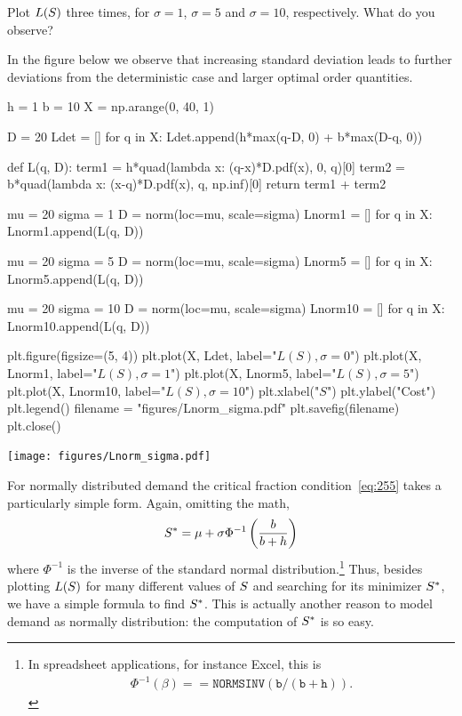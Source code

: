 \begin{exercise}[Continuation]
Plot $L(S)$ three times, for $\sigma=1$, $\sigma=5$ and $\sigma=10$, respectively. What do you observe?
\begin{solution}
In the figure below we observe that increasing standard deviation leads to further deviations from the deterministic case and larger optimal order quantities. 

\begin{pycode}[news]
h = 1
b = 10
X = np.arange(0, 40, 1)

D = 20
Ldet = []
for q in X:
    Ldet.append(h*max(q-D, 0) + b*max(D-q, 0))

def L(q, D):
    term1 = h*quad(lambda x: (q-x)*D.pdf(x), 0, q)[0]
    term2 = b*quad(lambda x: (x-q)*D.pdf(x), q, np.inf)[0]
    return term1 + term2


mu = 20
sigma = 1
D = norm(loc=mu, scale=sigma) 
Lnorm1 = []
for q in X:
    Lnorm1.append(L(q, D))

mu = 20
sigma = 5 
D = norm(loc=mu, scale=sigma) 
Lnorm5 = []
for q in X:
    Lnorm5.append(L(q, D))

mu = 20
sigma = 10
D = norm(loc=mu, scale=sigma) 
Lnorm10 = []
for q in X:
    Lnorm10.append(L(q, D))


plt.figure(figsize=(5, 4))
plt.plot(X, Ldet, label="$L(S), \sigma=0$")
plt.plot(X, Lnorm1, label="$L(S), \sigma=1$")
plt.plot(X, Lnorm5, label="$L(S), \sigma=5$")
plt.plot(X, Lnorm10, label="$L(S), \sigma=10$")
plt.xlabel("$S$")
plt.ylabel("Cost")
plt.legend()
filename = "figures/Lnorm_sigma.pdf"
plt.savefig(filename)
plt.close()
\end{pycode}

\begin{center}
\texttt{[image: figures/Lnorm\_sigma.pdf]}
\end{center}


\end{solution}
\end{exercise}


For normally distributed demand the critical fraction condition~\eqref{eq:255} takes a particularly simple form. Again, omitting the math,
\begin{equation}\label{eq:412}
S^* = \mu + \sigma \Phi^{-1}\left(\frac b{b+h}\right) 
\end{equation}
where $\Phi^{-1}$ is the inverse of the standard normal distribution.\footnote{In  spreadsheet applications,  for instance Excel, this is 
\begin{align*}
\Phi^{-1}(\beta)=\mathtt{=NORMSINV(b/(b+h))}.
\end{align*}
}
Thus, besides plotting $L(S)$ for many different values of $S$ and searching for its minimizer $S^*$, we have a simple formula to find $S^*$. This is actually another reason to model demand as normally distribution: the computation of $S^*$ is so easy.



